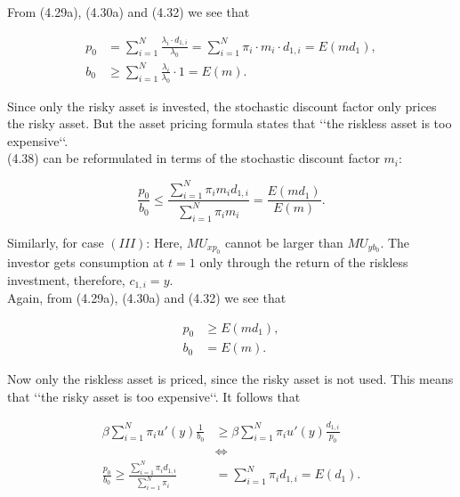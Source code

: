 \bigskip

\noindent From (4.29a), (4.30a) and (4.32) we see that

\begin{equation*}
\begin{split}
    p_0 &= \sum_{i=1}^N \frac{\lambda_i \cdot d_{1,i}}{\lambda_0} = \sum_{i=1}^N \pi_i \cdot m_i \cdot d_{1,i} = E(md_1),\\
    b_0 &\geq \sum_{i=1}^N \frac{\lambda_i}{\lambda_0} \cdot 1 = E(m).
\end{split}
\end{equation*}

\bigskip
\noindent Since only the risky asset is invested, the stochastic discount factor only prices the risky asset. But the asset pricing formula states that \lq\lq the riskless asset is too expensive\lq\lq.\\
(4.38) can be reformulated in terms of the stochastic discount factor $m_i$:

\begin{equation*}
    \frac{p_0}{b_0} \leq \frac{\sum_{i=1}^{N} \pi_i m_i d_{1,i}}{\sum_{i=1}^{N} \pi_i m_i} = \frac{E(md_1)}{E(m)}.
\end{equation*}

\bigskip

\noindent Similarly, for case $(III)$: Here, $MU_{xp_0}$ cannot be larger than $MU_{yb_0}$. The investor gets consumption at $t=1$ only through the return of the riskless investment, therefore, $c_{1,i} = y$. \\
Again, from (4.29a), (4.30a) and (4.32) we see that

\begin{equation*}
\begin{split}
    p_0 &\geq E(md_1),\\
    b_0 &= E(m).
\end{split}
\end{equation*}

\bigskip
\noindent Now only the riskless asset is priced, since the risky asset is not used. This means that \lq\lq the risky asset is too expensive\lq\lq . It follows that

\begin{equation}\label{eq:2yp0b0,x0}
\begin{split}
    \beta \sum_{i=1}^{N} \pi_i u'(y) \frac{1}{b_0} &\geq \beta \sum_{i=1}^{N} \pi_i u'(y) \frac{d_{1,i}}{p_0}\\
    &\Leftrightarrow\\
    \frac{p_0}{b_0} \geq \frac{\sum_{i=1}^{N} \pi_i d_{1,i}}{\sum_{i=1}^{N} \pi_i} &= \sum_{i=1}^{N} \pi_i d_{1,i} = E(d_1).
\end{split}
\end{equation}


